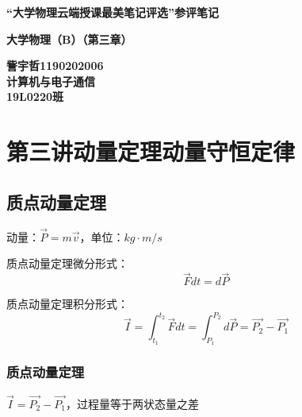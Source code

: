 \documentclass[UTF8]{article}
\begin{document}
\newpage

    \thispagestyle{empty}
    \begin{center}
    \parbox[t][1cm][t]{\textwidth}{
    \begin{center}  \end{center} }

    \parbox[t][1cm][c]{\textwidth}{\large
    \begin{center} {\textbf{\textsf \mbox{“大学物理云端授课最美笔记评选”参评笔记}}}\end{center} }

    \parbox[t][9cm][c]{\textwidth}{\huge
    \begin{center} {\textbf{\textsf \mbox{大学物理（B）（第三章）} }}\end{center} }

    \parbox[t][1cm][t]{\textwidth}{
    \begin{center}  \end{center} }

    \parbox[t][5cm][b]{\textwidth}{
    \begin{center} {\large \textsf{\textbf{訾宇哲1190202006\\
            计算机与电子通信\\ 19L0220班\\} }} \end{center} }
        \end{center}

\newpage
\tableofcontents
\newpage
\section{第三讲\;\;动量定理\;\;动量守恒定律}
\subsection{质点动量定理}

    动量：$\vec{P} = m\vec{v}$，单位：$kg\cdot m/s$
    
    质点动量定理微分形式：\[\vec{F}dt = d\vec{P}\]

    质点动量定理积分形式：\[\vec{I} = \int_{t_1}^{t_2}\vec{F}dt = \int_{P_1}^{P_2}d\vec{P} = \vec{P_2} - \vec{P_1}\]

\subsubsection{质点动量定理}

    $\vec{I} = \vec{P_2} - \vec{P_1}$，过程量等于两状态量之差
\end{document}

